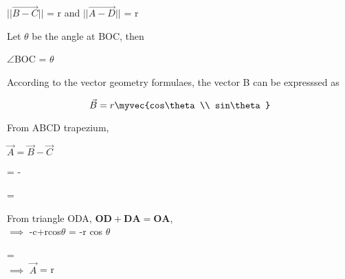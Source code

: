 \documentclass[journal,10pt,twocolumn]{article}
\begin{document}
\begin{flushleft}
\vspace{0.25cm}
$|| \vec{B-C} || $ = r and $|| \vec{A-D} || $ = r\\
\vspace{0.25cm}
\begin{flushleft}
Let $\theta$ be the angle at BOC, then\\
\end{flushleft}
\vspace{0.25cm}
$\angle$BOC = $\theta$\\
\vspace{0.25cm}
\begin{flushleft}
According to the vector geometry formulaes, the vector B can be expresssed as\\
\end{flushleft}
\vspace{0.25cm}
\begin{equation}
   \vec{B}= r \myvec{cos\theta \\ sin\theta}
\end{equation}

\vspace{0.35cm}
\begin{flushleft}
From ABCD trapezium, \\
\end{flushleft}
\begin{center}
$\vec{A} =\vec{B}-  \vec{C}$\\
\end{center}

\center
\vspace{0.4cm}
=  - 
   
\endcenter{}
		= 
	\\
\vspace{0.3cm}
\begin{flushleft}
From triangle ODA,
$\boldsymbol{OD+DA=OA}$, \\
\vspace{0.2cm} 
$\implies$ -c+rcos$\theta$ = -r cos $\theta$\\
\end{flushleft}
\vspace{0.35cm}
	=  \\
\endcenter{}
	$\implies$ $\vec{A}$
	= r \\
\end{flushleft}
\end{document}
